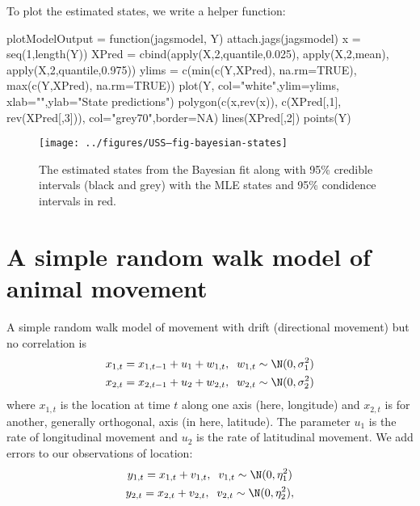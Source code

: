 To plot the estimated states, we write a helper function:
\begin{Schunk}
\begin{Sinput}
 plotModelOutput = function(jagsmodel, Y) {
   attach.jags(jagsmodel)
   x = seq(1,length(Y))
   XPred = cbind(apply(X,2,quantile,0.025), apply(X,2,mean), apply(X,2,quantile,0.975))
   ylims = c(min(c(Y,XPred), na.rm=TRUE), max(c(Y,XPred), na.rm=TRUE))
   plot(Y, col="white",ylim=ylims, xlab="",ylab="State predictions")
   polygon(c(x,rev(x)), c(XPred[,1], rev(XPred[,3])), col="grey70",border=NA)
   lines(XPred[,2])
   points(Y)
 }
\end{Sinput}
\end{Schunk}
\begin{figure}[htp]
\begin{center}
\begin{Schunk}
\end{Schunk}
\texttt{[image: ../figures/USS--fig-bayesian-states]}
\end{center}
\caption{The estimated states from the Bayesian fit along with 95\% credible intervals (black and grey) with the MLE states and 95\% condidence intervals in red.}
\label{fig:bayesian-states}
\end{figure}

\section{A simple random walk model of animal movement}
A simple random walk model of movement with drift (directional movement) but no correlation is 
\begin{gather}
x_{1,t} = x_{1,t-1} + u_1 + w_{1,t}, \;\; w_{1,t} \sim \N(0,\sigma^2_1)\\
x_{2,t} = x_{2,t-1} + u_2 + w_{2,t}, \;\; w_{2,t} \sim \N(0,\sigma^2_2)
\label{eq:movement}
\end{gather}
where $x_{1,t}$ is the location at time $t$ along one axis (here, longitude) and $x_{2,t}$ is for another, generally orthogonal, axis (in here, latitude).   The parameter $u_1$ is the rate of longitudinal movement and $u_2$ is the rate of latitudinal movement. We add errors to our observations of location:
\begin{gather}
y_{1,t} = x_{1,t} + v_{1,t}, \;\; v_{1,t} \sim \N(0,\eta^2_1)\\
y_{2,t} = x_{2,t} + v_{2,t}, \;\; v_{2,t} \sim \N(0,\eta^2_2),
\label{eq:observe}
\end{gather}

